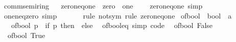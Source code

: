 \begin{isabellebody}
\ comm{\isacharunderscore}{\kern0pt}semiring{\isacharunderscore}{\kern0pt}{}%
\isadelimproof
\ %
\endisadelimproof
%
\isatagproof
\isacommand{{\isachardot}{\kern0pt}{\isachardot}{\kern0pt}}\isamarkupfalse%
%
\endisatagproof
{\isafoldproof}%
%
\isadelimproof
%
\endisadelimproof
\isanewline
\isanewline
{}\isamarkupfalse%
\isanewline
\isanewline
{}\isamarkupfalse%
\ zero{\isacharunderscore}{\kern0pt}neq{\isacharunderscore}{\kern0pt}one\ {\isacharequal}{\kern0pt}\ zero\ {\isacharplus}{\kern0pt}\ one\ {\isacharplus}{\kern0pt}\isanewline
\ \ \ zero{\isacharunderscore}{\kern0pt}neq{\isacharunderscore}{\kern0pt}one\ {\isacharbrackleft}{\kern0pt}simp{\isacharbrackright}{\kern0pt}{\isacharcolon}{\kern0pt}\ {\isachardoublequoteopen}{}\ {\isasymnoteq}\ {}{\isachardoublequoteclose}\isanewline
{}\isanewline
\isanewline
{}\isamarkupfalse%
\ one{\isacharunderscore}{\kern0pt}neq{\isacharunderscore}{\kern0pt}zero\ {\isacharbrackleft}{\kern0pt}simp{\isacharbrackright}{\kern0pt}{\isacharcolon}{\kern0pt}\ {\isachardoublequoteopen}{}\ {\isasymnoteq}\ {}{\isachardoublequoteclose}\isanewline
%
\isadelimproof
\ \ %
\endisadelimproof
%
\isatagproof
{}\isamarkupfalse%
\ {\isacharparenleft}{\kern0pt}rule\ not{\isacharunderscore}{\kern0pt}sym{\isacharparenright}{\kern0pt}\ {\isacharparenleft}{\kern0pt}rule\ zero{\isacharunderscore}{\kern0pt}neq{\isacharunderscore}{\kern0pt}one{\isacharparenright}{\kern0pt}%
\endisatagproof
{\isafoldproof}%
%
\isadelimproof
\isanewline
%
\endisadelimproof
\isanewline
{}\isamarkupfalse%
\ of{\isacharunderscore}{\kern0pt}bool\ {\isacharcolon}{\kern0pt}{\isacharcolon}{\kern0pt}\ {\isachardoublequoteopen}bool\ {\isasymRightarrow}\ {\isacharprime}{\kern0pt}a{\isachardoublequoteclose}\isanewline
\ \ \ {\isachardoublequoteopen}of{\isacharunderscore}{\kern0pt}bool\ p\ {\isacharequal}{\kern0pt}\ {\isacharparenleft}{\kern0pt}if\ p\ then\ {}\ else\ {}{\isacharparenright}{\kern0pt}{\isachardoublequoteclose}\isanewline
\isanewline
{}\isamarkupfalse%
\ of{\isacharunderscore}{\kern0pt}bool{\isacharunderscore}{\kern0pt}eq\ {\isacharbrackleft}{\kern0pt}simp{\isacharcomma}{\kern0pt}\ code{\isacharbrackright}{\kern0pt}{\isacharcolon}{\kern0pt}\isanewline
\ \ {\isachardoublequoteopen}of{\isacharunderscore}{\kern0pt}bool\ False\ {\isacharequal}{\kern0pt}\ {}{\isachardoublequoteclose}\isanewline
\ \ {\isachardoublequoteopen}of{\isacharunderscore}{\kern0pt}bool\ True\ {\isacharequal}{\kern0pt}\ {}{\isachardoublequoteclose}\isanewline

\end{isabellebody}
